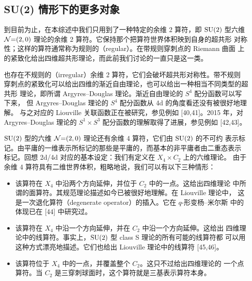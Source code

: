 \subsection{SU(2) 情形下的更多对象}

到目前为止，在本综述中我们只用到了一种特定的余维 2 算符，即 $\mathrm{SU}(2)$ 型六维
$\mathcal{N}{=}(2,0)$ 理论的余维 2 算符。它保持那个把算符世界体积映到自身的超共形
对称性；这样的算符通常称为规则的（regular）。在带规则穿刺点的 Riemann 曲面
上的紧致化给出四维超共形理论，而此前我们讨论的一直只是这一类。

也存在不规则的（irregular）余维 2 算符，它们会破坏超共形对称性。带不规则
穿刺点的紧致化可以给出四维的渐近自由理论，也可以给出一种相当不同类型的超共形
理论，即所谓 Argyres--Douglas 理论。渐近自由理论的 $S^4$ 配分函数可以写下来，
但 Argyres--Douglas 理论的 $S^4$ 配分函数从 4d 的角度看还没有被很好地理解。
与之对应的 Liouville 关联函数正在被研究，参见例如 [40,41]。2015 年，对
Argyres--Douglas 理论的 $S^1\times S^3$ 配分函数的理解取得了进展，参见例如
[42,43]。


$\mathrm{SU}(2)$ 型的六维 $\mathcal{N}{=}(2,0)$ 理论还有余维 4 算符，它们由 $\mathrm{SU}(2)$ 的不可约
表示标记。由平庸的一维表示所标记的那些是平庸的，而基本的非平庸者由二重态表示
标记。回想 2d/4d 对应的基本设定：我们有定义在 $X_4\times C_2$ 上的六维理论。
由于余维 4 算符具有二维世界体积，粗略地说，我们可以有以下三种情形：

\begin{itemize}
\item 该算符在 $X_4$ 中沿两个方向延伸，并位于 $C_2$ 中的一点。这给出四维理论
  中所谓的面算符。其规范理论描述如今已被很好地理解。在 Liouville 理论中，
  这是一次退化算符（degenerate operator）的插入。它在 $q$-形变杨--米尔斯
  中的体现已在 [44] 中研究过。
\item 该算符在 $X_4$ 中沿一个方向延伸，并在 $C_2$ 中沿一个方向延伸。这给出
  四维理论中的线算符。事实上，$\mathrm{SU}(2)$ 型 class S 理论的所有可能的线算符都
  可以用这种方式漂亮地描述。它们也给出 Liouville 理论中的线算符 [45,46]。
\item 该算符位于 $X_4$ 中的一点，并覆盖整个 $C_2$。这只不过给出四维理论的
  一个点算符。当 $C_2$ 是三穿刺球面时，这个算符就是三基表示算符本身。
\end{itemize}


